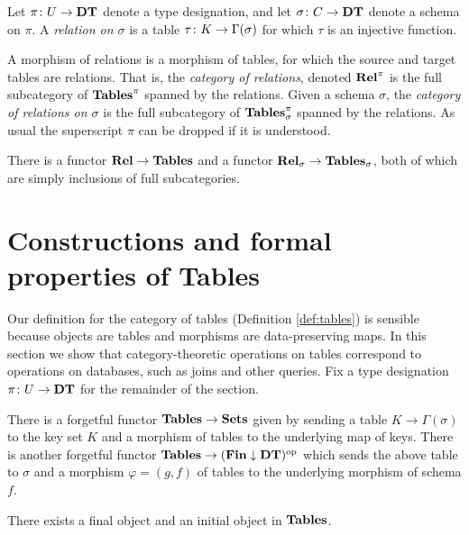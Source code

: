 \documentclass{amsart}
\def\DT{{\bf DT}}
\def\Tables{{\bf Tables}}
\def\Rel{{\bf Rel}}
\def\Fin{{\bf Fin}}
\begin{document}
\begin{definition}\label{def:relational table}

Let $\pi\taking U\to\DT$ denote a type designation, and let $\sigma\taking C\to\DT$ denote a schema on $\pi$.  A {\em relation on $\sigma$} is a table $\tau\colon K\rightarrow\Gamma(\sigma)$ for which $\tau$ is an injective function.  

A morphism of relations is a morphism of tables, for which the source and target tables are relations.  That is, the {\em category of relations}, denoted $\Rel^\pi$ is the full subcategory of $\Tables^\pi$ spanned by the relations.  Given a schema $\sigma$, the {\em category of relations on $\sigma$} is the full subcategory of $\Tables^\pi_\sigma$ spanned by the relations.  As usual the superscript $\pi$ can be dropped if it is understood.

There is a functor $\Rel\to\Tables$ and a functor $\Rel_\sigma\to\Tables_\sigma$, both of which are simply inclusions of full subcategories.

\end{definition}

\section{Constructions and formal properties of Tables}\label{sec:constructions for tables}

Our definition for the category of tables (Definition \ref{def:tables}) is sensible because objects are tables and morphisms are data-preserving maps.  In this section we show that category-theoretic operations on tables correspond to operations on databases, such as joins and other queries.  Fix a type designation $\pi\taking U\to\DT$ for the remainder of the section.

There is a forgetful functor $\Tables\to\Sets$ given by sending a table $K\to\Gamma(\sigma)$ to the key set $K$ and a morphism of tables to the underlying map of keys.  There is another forgetful functor $\Tables\to(\Fin\down\DT)\op$ which sends the above table to $\sigma$ and a morphism $\varphi=(g,f)$ of tables to the underlying morphism of schema $f$.

\begin{lemma}\label{final object}

There exists a final object and an initial object in $\Tables$.    

\end{lemma}
\end{document}
